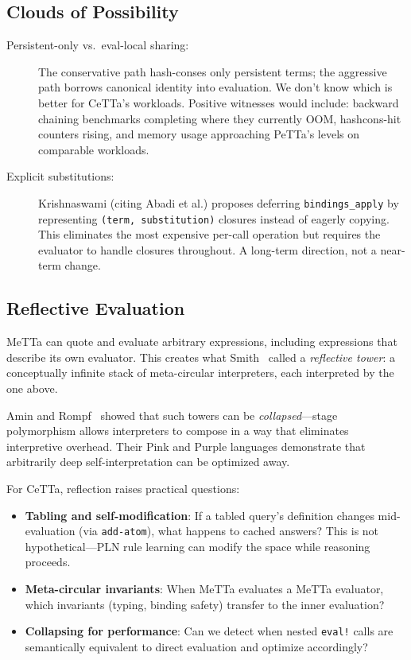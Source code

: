 \documentclass[11pt]{article}
\newcommand{\code}[1]{\texttt{#1}}
\newcommand{\PeTTa}{\textup{PeTTa}}
\newcommand{\CeTTa}{\textup{CeTTa}}
\begin{document}
\subsection{Clouds of Possibility}

\begin{description}
\item[Persistent-only vs.\ eval-local sharing:]
  The conservative path hash-conses only persistent terms; the aggressive
  path borrows canonical identity into evaluation.  We don't know which
  is better for \CeTTa{}'s workloads.  Positive witnesses would include:
  backward chaining benchmarks completing where they currently OOM,
  hashcons-hit counters rising, and memory usage approaching \PeTTa{}'s
  levels on comparable workloads.
\item[Explicit substitutions:]
  Krishnaswami (citing Abadi et al.) proposes deferring
  \code{bindings\_apply} by representing \code{(term, substitution)}
  closures instead of eagerly copying.  This eliminates the most expensive
  per-call operation but requires the evaluator to handle closures
  throughout.  A long-term direction, not a near-term change.
\end{description}

\subsection{Reflective Evaluation}

MeTTa can quote and evaluate arbitrary expressions, including expressions
that describe its own evaluator.  This creates what Smith~\cite{Smith1984}
called a \emph{reflective tower}: a conceptually infinite stack of
meta-circular interpreters, each interpreted by the one above.

Amin and Rompf~\cite{AminRompf2018} showed that such towers can be
\emph{collapsed}---stage polymorphism allows interpreters to compose in a
way that eliminates interpretive overhead.  Their Pink and Purple languages
demonstrate that arbitrarily deep self-interpretation can be optimized away.

For \CeTTa{}, reflection raises practical questions:
\begin{itemize}
\item \textbf{Tabling and self-modification}: If a tabled query's definition
  changes mid-evaluation (via \code{add-atom}), what happens to cached answers?
  This is not hypothetical---PLN rule learning can modify the space while
  reasoning proceeds.
\item \textbf{Meta-circular invariants}: When MeTTa evaluates a MeTTa
  evaluator, which invariants (typing, binding safety) transfer to the
  inner evaluation?
\item \textbf{Collapsing for performance}: Can we detect when nested
  \code{eval!} calls are semantically equivalent to direct evaluation and
  optimize accordingly?
\end{itemize}
\end{document}
